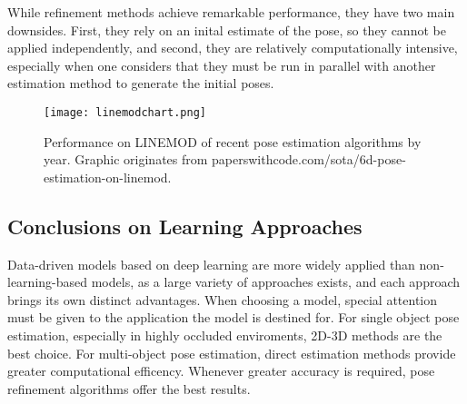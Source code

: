 While refinement methods achieve remarkable performance, they have two main downsides. First, they rely on an inital estimate of the pose, so they cannot be applied independently, and second, they are relatively computationally intensive, especially when one considers that they must be run in parallel with another estimation method to generate the initial poses.

\begin{figure}[ht]
    \centering
    \texttt{[image: linemodchart.png]}
    \caption{Performance on LINEMOD of recent pose estimation algorithms by year. Graphic originates from paperswithcode.com/sota/6d-pose-estimation-on-linemod.}
    \label{fig:linemodchart}
\end{figure}

\subsection{Conclusions on Learning Approaches}

Data-driven models based on deep learning are more widely applied than non-learning-based models, as a large variety of approaches exists, and each approach brings its own distinct advantages. When choosing a model, special attention must be given to the application the model is destined for. For single object pose estimation, especially in highly occluded enviroments, 2D-3D methods are the best choice. For multi-object pose estimation, direct estimation methods provide greater computational efficency. Whenever greater accuracy is required, pose refinement algorithms offer the best results.
